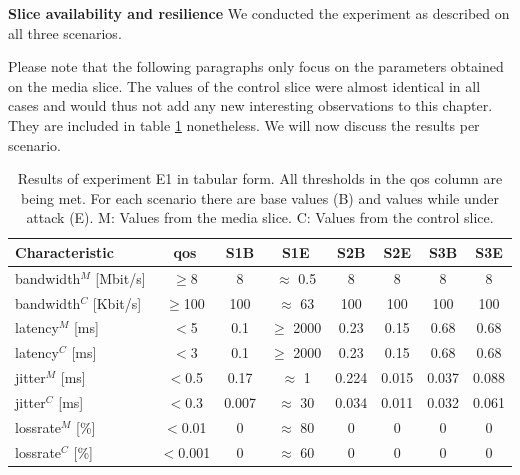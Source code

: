 \begin{description}[style=multiline, labelwidth=0.7cm]
    \item[\ref{E1}] \textbf{Slice availability and resilience} We conducted the experiment as described on all three scenarios.

    Please note that the following paragraphs only focus on the parameters obtained on the media slice. The values of the control slice were almost identical in all cases and would thus not add any new interesting observations to this chapter. They are included in table \ref{table:validation_qos_results} nonetheless. We will now discuss the results per scenario.

    \begin{table}[ht]
        \centering
        \begin{tabular}{|l|c|c|c|c|c|c|c|}
            \hline
            \textbf{Characteristic}      & \textbf{\acrshort{qos}} & \textbf{S1B} & \textbf{S1E}  & \textbf{S2B} & \textbf{S2E} & \textbf{S3B} & \textbf{S3E} \\
            \hline
            \Gls{bandwidth}$^M$ [Mbit/s] & $\geq$8                 & 8            & $\approx$ 0.5 & 8            & 8            & 8            & 8            \\
            \Gls{bandwidth}$^C$ [Kbit/s] & $\geq$100               & 100          & $\approx$ 63  & 100          & 100          & 100          & 100          \\
            \hline
            \Gls{latency}$^M$ [ms]       & $<$5                    & 0.1          & $\geq$ 2000   & 0.23         & 0.15         & 0.68         & 0.68         \\
            \Gls{latency}$^C$ [ms]       & $<$3                    & 0.1          & $\geq$ 2000   & 0.23         & 0.15         & 0.68         & 0.68         \\
            \hline
            \Gls{jitter}$^M$ [ms]        & $<$0.5                  & 0.17         & $\approx$ 1   & 0.224        & 0.015        & 0.037        & 0.088        \\
            \Gls{jitter}$^C$ [ms]        & $<$0.3                  & 0.007        & $\approx$ 30  & 0.034        & 0.011        & 0.032        & 0.061        \\
            \hline
            \Gls{lossrate}$^M$ [\%]      & $<$0.01                 & 0            & $\approx$ 80  & 0            & 0            & 0            & 0            \\
            \Gls{lossrate}$^C$ [\%]      & $<$0.001                & 0            & $\approx$ 60  & 0            & 0            & 0            & 0            \\
            \hline
        \end{tabular}
        \caption[Results of experiment E1]{Results of experiment E1 in tabular form. All thresholds in the \acrshort{qos} column are being met. For each scenario there are base values (B) and values while under attack (E). M: Values from the media slice. C: Values from the control slice.}
        \label{table:validation_qos_results}
    \end{table}


\end{description}
